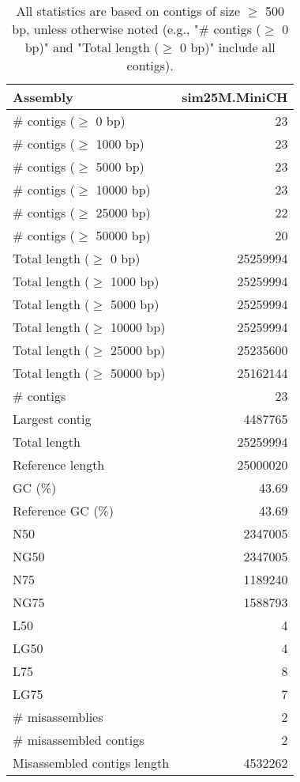 \documentclass[12pt,a4paper]{article}
\begin{document}
\begin{table}[ht]
\begin{center}
\caption{All statistics are based on contigs of size $\geq$ 500 bp, unless otherwise noted (e.g., "\# contigs ($\geq$ 0 bp)" and "Total length ($\geq$ 0 bp)" include all contigs).}
\begin{tabular}{|l*{1}{|r}|}
\hline
Assembly & sim25M.MiniCH \\ \hline
\# contigs ($\geq$ 0 bp) & 23 \\ \hline
\# contigs ($\geq$ 1000 bp) & 23 \\ \hline
\# contigs ($\geq$ 5000 bp) & 23 \\ \hline
\# contigs ($\geq$ 10000 bp) & 23 \\ \hline
\# contigs ($\geq$ 25000 bp) & 22 \\ \hline
\# contigs ($\geq$ 50000 bp) & 20 \\ \hline
Total length ($\geq$ 0 bp) & 25259994 \\ \hline
Total length ($\geq$ 1000 bp) & 25259994 \\ \hline
Total length ($\geq$ 5000 bp) & 25259994 \\ \hline
Total length ($\geq$ 10000 bp) & 25259994 \\ \hline
Total length ($\geq$ 25000 bp) & 25235600 \\ \hline
Total length ($\geq$ 50000 bp) & 25162144 \\ \hline
\# contigs & 23 \\ \hline
Largest contig & 4487765 \\ \hline
Total length & 25259994 \\ \hline
Reference length & 25000020 \\ \hline
GC (\%) & 43.69 \\ \hline
Reference GC (\%) & 43.69 \\ \hline
N50 & 2347005 \\ \hline
NG50 & 2347005 \\ \hline
N75 & 1189240 \\ \hline
NG75 & 1588793 \\ \hline
L50 & 4 \\ \hline
LG50 & 4 \\ \hline
L75 & 8 \\ \hline
LG75 & 7 \\ \hline
\# misassemblies & 2 \\ \hline
\# misassembled contigs & 2 \\ \hline
Misassembled contigs length & 4532262 \\ \hline

\end{tabular}
\end{center}
\end{table}
\end{document}
